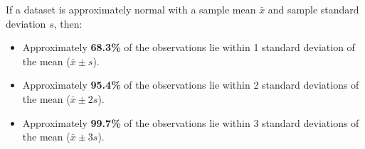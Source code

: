 \begin{theorem}
If a dataset is approximately normal with a sample mean $\bar{x}$ and sample standard deviation $s$, then:
\begin{itemize}
    \item Approximately \textbf{68.3\%} of the observations lie within 1 standard deviation of the mean ($\bar{x} \pm s$).
    \item Approximately \textbf{95.4\%} of the observations lie within 2 standard deviations of the mean ($\bar{x} \pm 2s$).
    \item Approximately \textbf{99.7\%} of the observations lie within 3 standard deviations of the mean ($\bar{x} \pm 3s$).
\end{itemize}
\end{theorem}

